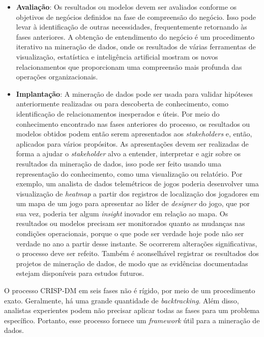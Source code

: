 \begin{itemize}
  \item
\textbf{Avaliação}: Os resultados ou modelos devem ser avaliados conforme os objetivos de negócios definidos na fase de compreensão do negócio. Isso pode levar à identificação de outras necessidades, frequentemente retornando às fases anteriores. A obtenção de entendimento do negócio é um procedimento iterativo na mineração de dados, onde os resultados de várias ferramentas de visualização, estatística e inteligência artificial mostram os novos relacionamentos que proporcionam uma compreensão mais profunda das operações organizacionais.
  \item
\textbf{Implantação}: A mineração de dados pode ser usada para validar hipóteses anteriormente realizadas ou para descoberta de conhecimento, como identificação de relacionamentos inesperados e úteis. Por meio do conhecimento encontrado nas fases anteriores do processo, os resultados ou modelos obtidos podem então serem apresentados aos \textit{stakeholders} e, então, aplicados para vários propósitos. As apresentações devem ser realizadas de forma a ajudar o \textit{stakeholder} alvo a entender, interpretar e agir sobre os resultados da mineração de dados, isso pode ser feito usando uma representação do conhecimento, como uma visualização ou relatório. Por exemplo, um analista de dados telemétricos de jogos poderia desenvolver uma visualização de \textit{heatmap} a partir dos registros de localização dos jogadores em um mapa de um jogo para apresentar ao líder de \textit{designer} do jogo, que por sua vez, poderia ter algum \textit{insight} inovador em relação ao mapa. Os resultados ou modelos precisam ser monitorados quanto as mudanças nas condições operacionais, porque o que pode ser verdade hoje pode não ser verdade no ano a partir desse instante. Se ocorrerem alterações significativas, o processo deve ser refeito. Também é aconselhável registrar os resultados dos projetos de mineração de dados, de modo que as evidências documentadas estejam disponíveis para estudos futuros.

\end{itemize}
O processo CRISP-DM em seis fases não é rígido, por meio de um procedimento exato. Geralmente, há uma grande quantidade de \textit{backtracking}. Além disso, analistas experientes podem não precisar aplicar todas as fases para um problema específico. Portanto, esse processo fornece um \textit{framework} útil para a mineração de dados.

